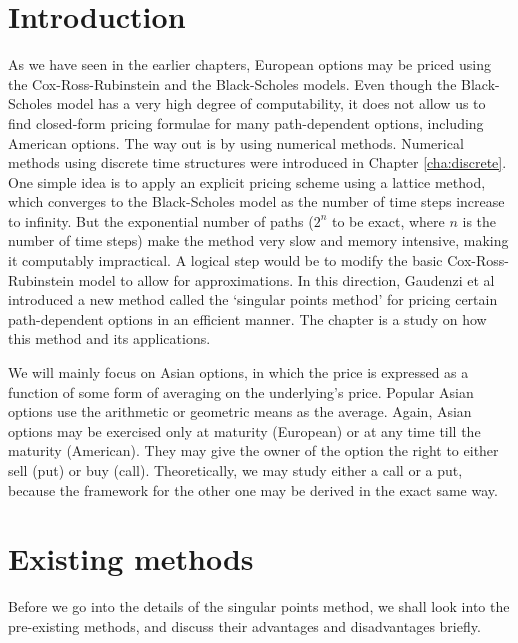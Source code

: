 

\section{Introduction}
\label{sec:sp-asian-intro}
As we have seen in the earlier chapters, European options may be priced using the Cox-Ross-Rubinstein and the Black-Scholes models. Even though the Black-Scholes model has a very high degree of computability, it does not allow us to find closed-form pricing formulae for many path-dependent options, including American options. The way out is by using numerical methods. Numerical methods using discrete time structures were introduced in Chapter \ref{cha:discrete}. One simple idea is to apply an explicit pricing scheme using a lattice method, which converges to the Black-Scholes model as the number of time steps increase to infinity. But the exponential number of paths ($2^n$ to be exact, where $n$ is the number of time steps) make the method very slow and memory intensive, making it computably impractical. A logical step would be to modify the basic Cox-Ross-Rubinstein model to allow for approximations. In this direction, Gaudenzi et al\cite{Gaudenzi2010} introduced a new method called the `singular points method' for pricing certain path-dependent options in an efficient manner. The chapter is a study on how this method and its applications.

We will mainly focus on Asian options, in which the price is expressed as a function of some form of averaging on the underlying's price. Popular Asian options use the arithmetic or geometric means as the average. Again, Asian options may be exercised only at maturity (European) or at any time till the maturity (American). They may give the owner of the option the right to either sell (put) or buy (call). Theoretically, we may study either a call or a put, because the framework for the other one may be derived in the exact same way.



\section{Existing methods}
\label{sec:existing-methods}

Before we go into the details of the singular points method, we shall look into the pre-existing methods, and discuss their advantages and disadvantages briefly.

